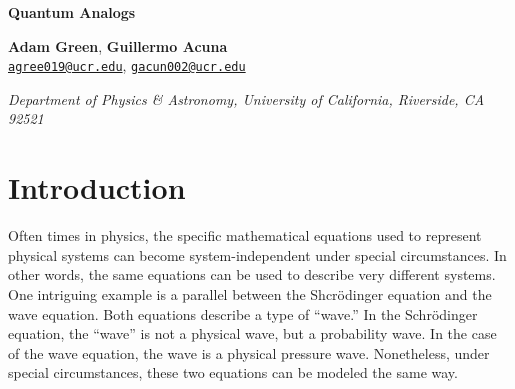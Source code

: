 \documentclass[12pt]{article}
\newcommand{\email}[1]{\href{mailto:#1}{\textcolor{mygreen1}{#1}}}
\newenvironment{institutions}[1][2em]{\begin{list}{}{\setlength\leftmargin{#1}\setlength\rightmargin{#1}}\item[]}{\end{list}}
\begin{document}
	
\begin{center}

	{\huge \bf Quantum Analogs}
	
	\vspace{0.5cm}
	
	\textbf{Adam Green}, \textbf{Guillermo Acuna}\\
	
	\texttt{\footnotesize \email{agree019@ucr.edu}},
	\texttt{\footnotesize \email{gacun002@ucr.edu}}
	
	\vspace{0.5cm}
	
	
	\begin{institutions}[2.25cm]
		\footnotesize
		{\it 
			Department of Physics \& Astronomy, 
			University of  California, Riverside, 
			{CA} 92521	    
		}    
	\end{institutions}

	\vspace{0.5cm}
	
\end{center}

	\vspace{0.5cm}

\begin{abstract}
	In this experiment, we model the quantum mechanical wavefunction of the Hydrogen atom as a pressure wave inside a spherical cavity. We find that, for a spherically symmetric cavity, the standing pressure waves coincide with the polynomials to a standard error of 0.0360 and polar graphs of acoustic amplitude against polar angle, at a qualitative level, match those of the spherical harmonics. Further, we simulate the Zeeman effect and break the spherical symmetry by elongating the cavity with spacing rings. For the $\ell=1$ state, we are able to resolve the $m=0$ and $m=\pm1$ resonant peaks. Polar graphs of acoustic amplitude for the split peaks correspond to their respective spherical harmonics.
\end{abstract}


\tableofcontents


\section{Introduction}
Often times in physics, the specific mathematical equations used to represent physical systems can become system-independent under special circumstances. In other words, the same equations can be used to describe very different systems. One intriguing example is a parallel between the Shcr\"odinger equation and the wave equation. Both equations describe a type of ``wave.'' In the Schr\"odinger equation, the ``wave'' is not a physical wave, but a probability wave. In the case of the wave equation, the wave is a physical pressure wave. Nonetheless, under special circumstances, these two equations can be modeled the same way.
\end{document}
